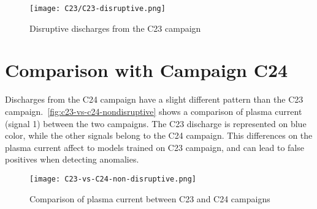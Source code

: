 \begin{figure}[H]
    \centering
    \texttt{[image: C23/C23-disruptive.png]}
    \caption{Disruptive discharges from the C23 campaign}
    \label{fig:c23-disruptive}    
\end{figure}

\section{Comparison with Campaign C24}

Discharges from the C24 campaign have a slight different pattern than the C23 campaign.\ \autoref{fig:c23-vs-c24-nondisruptive} shows a comparison of plasma current (signal 1) between the two campaigns. The C23 discharge is represented on blue color, while the other signals belong to the C24 campaign. This differences on the plasma current affect to models trained on C23 campaign, and can lead to false positives when detecting anomalies.

\begin{figure}[H]
    \centering
    \texttt{[image: C23-vs-C24-non-disruptive.png]}
    \caption{Comparison of plasma current between C23 and C24 campaigns}
    \label{fig:c23-vs-c24-nondisruptive}
\end{figure}
